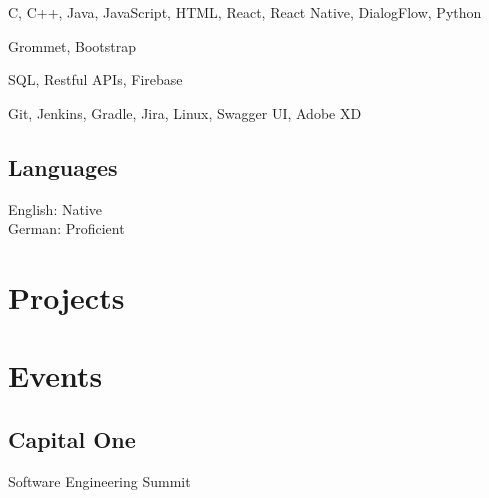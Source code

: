 \documentclass[]{hieudo-build}
\begin{document}
\begin{minipage}[t]{0.34\textwidth}
C, C++, Java, JavaScript, HTML, React, React Native, DialogFlow, Python\\ 
\smallsectionsep

Grommet, Bootstrap \\
\smallsectionsep

SQL, Restful APIs, Firebase \\
\smallsectionsep

Git, Jenkins, Gradle, Jira, Linux, Swagger UI, Adobe XD\\
\sectionsep

\subsection{Languages}
\smallsectionsep
English: Native \\
German: Proficient \\
\sectionsep

\section{Projects}
\sectionsep



\section{Events}
\subsection{Capital One} 
Software Engineering Summit \\
\smallsectionsep

\end{minipage}
\end{document}
